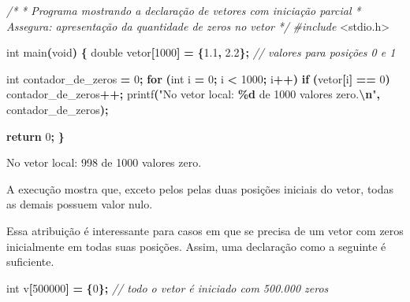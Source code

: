 \documentclass[
  11pt,
  a4paper,
]{scrbook}
\newenvironment{Shaded}{\begin{snugshade}}{\end{snugshade}}
\newcommand{\CommentTok}[1]{\textcolor[rgb]{0.56,0.35,0.01}{\textit{#1}}}
\newcommand{\ControlFlowTok}[1]{\textcolor[rgb]{0.13,0.29,0.53}{\textbf{#1}}}
\newcommand{\DataTypeTok}[1]{\textcolor[rgb]{0.13,0.29,0.53}{#1}}
\newcommand{\DecValTok}[1]{\textcolor[rgb]{0.00,0.00,0.81}{#1}}
\newcommand{\FloatTok}[1]{\textcolor[rgb]{0.00,0.00,0.81}{#1}}
\newcommand{\ImportTok}[1]{#1}
\newcommand{\NormalTok}[1]{#1}
\newcommand{\OperatorTok}[1]{\textcolor[rgb]{0.81,0.36,0.00}{\textbf{#1}}}
\newcommand{\PreprocessorTok}[1]{\textcolor[rgb]{0.56,0.35,0.01}{\textit{#1}}}
\newcommand{\SpecialCharTok}[1]{\textcolor[rgb]{0.81,0.36,0.00}{\textbf{#1}}}
\newcommand{\StringTok}[1]{\textcolor[rgb]{0.31,0.60,0.02}{#1}}
\begin{document}
\begin{Shaded}
\begin{Highlighting}[]
\CommentTok{/*}
\CommentTok{ * Programa mostrando a declaração de vetores com iniciação parcial}
\CommentTok{ * Assegura: apresentação da quantidade de zeros no vetor}
\CommentTok{ */}
\PreprocessorTok{\#include }\ImportTok{\textless{}stdio.h\textgreater{}}

\DataTypeTok{int}\NormalTok{ main}\OperatorTok{(}\DataTypeTok{void}\OperatorTok{)} \OperatorTok{\{}
    \DataTypeTok{double}\NormalTok{ vetor}\OperatorTok{[}\DecValTok{1000}\OperatorTok{]} \OperatorTok{=} \OperatorTok{\{}\FloatTok{1.1}\OperatorTok{,} \FloatTok{2.2}\OperatorTok{\};}  \CommentTok{// valores para posições 0 e 1}

    \DataTypeTok{int}\NormalTok{ contador\_de\_zeros }\OperatorTok{=} \DecValTok{0}\OperatorTok{;}
    \ControlFlowTok{for} \OperatorTok{(}\DataTypeTok{int}\NormalTok{ i }\OperatorTok{=} \DecValTok{0}\OperatorTok{;}\NormalTok{ i }\OperatorTok{\textless{}} \DecValTok{1000}\OperatorTok{;}\NormalTok{ i}\OperatorTok{++)}
        \ControlFlowTok{if} \OperatorTok{(}\NormalTok{vetor}\OperatorTok{[}\NormalTok{i}\OperatorTok{]} \OperatorTok{==} \DecValTok{0}\OperatorTok{)}
\NormalTok{            contador\_de\_zeros}\OperatorTok{++;}
\NormalTok{    printf}\OperatorTok{(}\StringTok{"No vetor local: }\SpecialCharTok{\%d}\StringTok{ de 1000 valores zero.}\SpecialCharTok{\textbackslash{}n}\StringTok{"}\OperatorTok{,}\NormalTok{ contador\_de\_zeros}\OperatorTok{);}

    \ControlFlowTok{return} \DecValTok{0}\OperatorTok{;}
\OperatorTok{\}}
\end{Highlighting}
\end{Shaded}

\begin{Shaded}
\begin{Highlighting}[]
\NormalTok{No vetor local: 998 de 1000 valores zero.}
\end{Highlighting}
\end{Shaded}

A execução mostra que, exceto pelos pelas duas posições iniciais do
vetor, todas as demais possuem valor nulo.

Essa atribuição é interessante para casos em que se precisa de um vetor
com zeros inicialmente em todas suas posições. Assim, uma declaração
como a seguinte é suficiente.

\begin{Shaded}
\begin{Highlighting}[]
\DataTypeTok{int}\NormalTok{ v}\OperatorTok{[}\DecValTok{500000}\OperatorTok{]} \OperatorTok{=} \OperatorTok{\{}\DecValTok{0}\OperatorTok{\};}  \CommentTok{// todo o vetor é iniciado com 500.000 zeros}
\end{Highlighting}
\end{Shaded}
\end{document}
